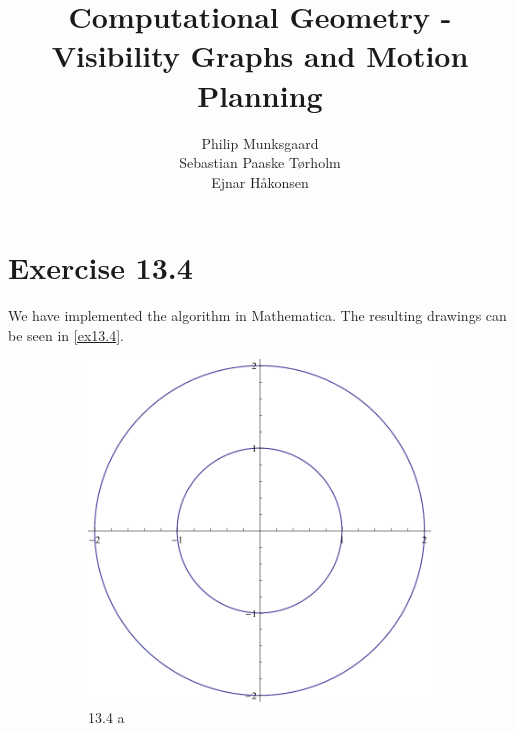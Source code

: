 \documentclass[11pt,a4paper]{article}
\title{Computational Geometry - Visibility Graphs and Motion Planning}
\author{Philip Munksgaard \\ Sebastian Paaske Tørholm \\ Ejnar Håkonsen}
\begin{document}
\maketitle

\section{Exercise 13.4}

We have implemented the algorithm in Mathematica. The resulting drawings
can be seen in \autoref{ex13.4}.

\begin{figure}
    \centering
    \begin{subfigure}[b]{.4\textwidth}
        \includegraphics[width=\textwidth]{ex13-4-a.pdf}
        \caption{13.4 a}
    \end{subfigure}
    \begin{subfigure}[b]{.4\textwidth}

\end{subfigure}
\end{figure}
\end{document}
